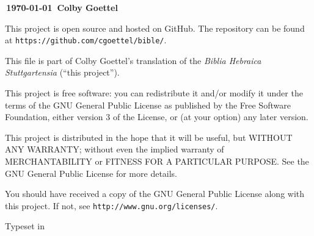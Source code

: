 \onecolumn
\vfill

\begin{center}
    \textbf{\textcopyleft\,\justtheyear\today\ Colby Goettel}
\end{center}

\vfill

This project is open source and hosted on GitHub. The repository can be found at \texttt{https://github.com/cgoettel/bible/}.

\vfill

This file is part of Colby Goettel's translation of the \emph{Biblia Hebraica Stuttgartensia} (``this project'').

This project is free software: you can redistribute it and/or modify it under the terms of the GNU General Public License as published by the Free Software Foundation, either version 3 of the License, or (at your option) any later version.

This project is distributed in the hope that it will be useful, but WITHOUT ANY WARRANTY; without even the implied warranty of MERCHANTABILITY or FITNESS FOR A PARTICULAR PURPOSE.  See the GNU General Public License for more details.

You should have received a copy of the GNU General Public License along with this project. If not, see \texttt{http://www.gnu.org/licenses/}.

\vfill

\begin{center}
    Typeset in \XeTeX
\end{center}
\twocolumn
